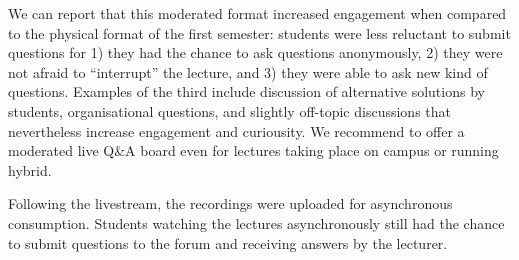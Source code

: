 We can report that this moderated format increased engagement when compared to the physical format of the first semester:
students were less reluctant to submit questions for
1) they had the chance to ask questions anonymously,
2) they were not afraid to ``interrupt'' the lecture, and
3) they were able to ask new kind of questions.
Examples of the third include discussion of alternative solutions by students,
organisational questions,
and slightly off-topic discussions that nevertheless increase engagement and curiousity.
We recommend to offer a moderated live Q\&A board even for lectures taking place on campus or running hybrid.

Following the livestream,
the recordings were uploaded for asynchronous consumption.
Students watching the lectures asynchronously still had the chance to submit questions to the forum and receiving answers by the lecturer.

